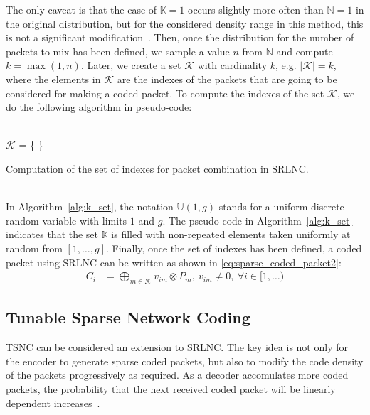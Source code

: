 The only caveat is that the case of $\mathbb{K} = 1$ occurs slightly
more often than $\mathbb{N} = 1$ in the original distribution, but for
the considered density range in this method, this is not a significant
modification~\cite{practicalview_tsnc2015}. Then, once the
distribution for the number of packets to mix has been defined, we
sample a value $n$ from $\mathbb{N}$ and compute $k =
\max(1,n)$. Later, we create a set $\mathcal{K}$ with
cardinality $k$, e.g. $|\mathcal{K}| = k$, where the elements in
$\mathcal{K}$ are the indexes of the packets that are going to be
considered for making a coded packet. To compute the indexes
of the set $\mathcal{K}$, we do the following algorithm in pseudo-code: \\
\ \\
\begin{algorithm}[H]
 \label{alg:k_set}
 $\mathcal{K}$ = \{ \}\;
 \caption{Computation of the set of indexes for packet combination in SRLNC.}
\end{algorithm}
\ \\
In Algorithm~\ref{alg:k_set}, the notation $\mathbb{U}(1,g)$ stands
for a uniform discrete random variable with limits $1$ and $g$. The
pseudo-code in Algorithm~\ref{alg:k_set} indicates that the set $\mathbb{K}$
is filled with non-repeated elements taken uniformly at random from
$[1,\ldots,g]$. Finally, once the set of indexes has been defined, a coded
packet using \ac{SRLNC} can be written as shown in
\eqref{eq:sparse_coded_packet2}:
%
\begin{align} \label{eq:sparse_coded_packet2}
    C_i  &= \bigoplus_{m \in \mathcal{K}} v_{im} \otimes P_{m},\ v_{im} \neq 0,\ \forall i \in [1,\ldots)
\end{align}

\subsection{Tunable Sparse Network Coding}

\ac{TSNC} can be considered an extension to \ac{SRLNC}. The key idea is
not only for the encoder to generate sparse coded packets, but also to
modify the code density of the packets progressively as required. As a
decoder accomulates more coded packets, the probability that the next
received coded packet will be linearly dependent increases~\cite{Feizi2012}.


